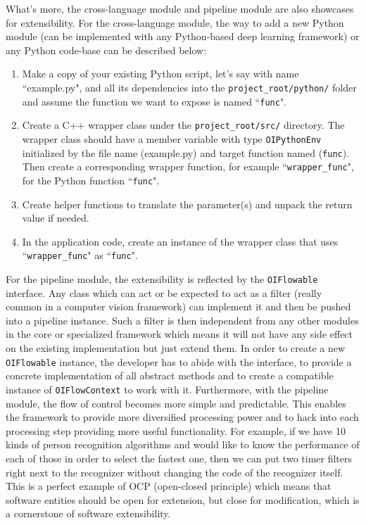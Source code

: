 What's more, the cross-language module and pipeline module are also showcases
for extensibility. For the cross-language module, the way to add a new Python
module (can be implemented with any Python-based deep learning framework) or any
Python code-base can be described below:

\begin{enumerate}
    \item Make a copy of your existing Python script, let's say with name
    ``example.py", and all its dependencies into the \texttt{project\_root/python/}
    folder and assume the function we want to expose is named ``\texttt{func}".
    \item Create a C++ wrapper class under the \texttt{project\_root/src/}
    directory. The wrapper class should have a member variable with type
    \texttt{OIPythonEnv} initialized by the file name (example.py) and target
    function named (\texttt{func}). Then create a corresponding wrapper
    function, for example ``\texttt{wrapper\_func}", for the Python function
    ``\texttt{func}".
    \item Create helper functions to translate the parameter(s) and unpack the
    return value if needed.
    \item In the application code, create an instance of the wrapper class that
    uses ``\texttt{wrapper\_func}" as ``\texttt{func}".
\end{enumerate}

For the pipeline module, the extensibility is reflected by the
\texttt{OIFlowable} interface. Any class which can act or be expected to act as
a filter (really common in a computer vision framework) can implement it and then
be pushed into a pipeline instance.
Such a filter is then independent from any other modules in the core or specialized framework
which means it will not have any side effect on the existing implementation but
just extend them.
In order to create a new \texttt{OIFlowable} instance, the developer has to abide with the
interface, to provide a concrete implementation of all abstract methods and to create
a compatible instance of \texttt{OIFlowContext} to work with it.
Furthermore, with the pipeline module, the flow of control becomes more 
simple and predictable. This enables the framework to provide more diversified processing power and 
to hack into each processing step providing more useful functionality. For example, if we have 10 kinds of 
person recognition algorithms and would like to know the performance of each
of those in order to select the fastest one, then we can put two timer filters 
right next to the recognizer without changing the code of the recognizer itself.
This is a perfect example of OCP (open-closed principle) which means 
that software entities should be open for extension, but close for modification, 
which is a cornerstone of software extensibility. 

